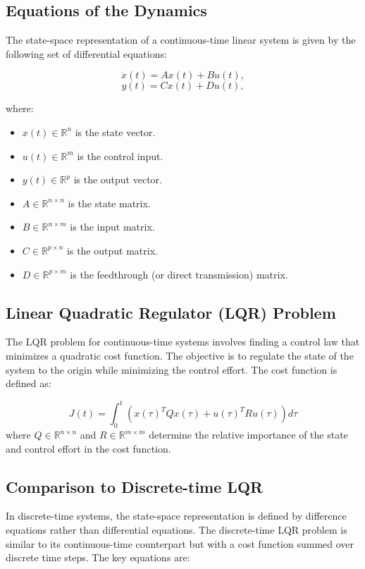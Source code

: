 \documentclass[a4 paper]{article}
\begin{document}
\subsection{Equations of the Dynamics}
The state-space representation of a continuous-time linear system is given by the following set of differential equations:

\begin{equation}
    \dot{x}(t) = A x(t) + B u(t),
\end{equation}
\begin{equation}
    y(t) = C x(t) + D u(t),
\end{equation}

where:
\begin{itemize}
    \item $x(t) \in \mathbb{R}^n$ is the state vector.
    \item $u(t) \in \mathbb{R}^m$ is the control input.
    \item $y(t) \in \mathbb{R}^p$ is the output vector.
    \item $A \in \mathbb{R}^{n \times n}$ is the state matrix.
    \item $B \in \mathbb{R}^{n \times m}$ is the input matrix.
    \item $C \in \mathbb{R}^{p \times n}$ is the output matrix.
    \item $D \in \mathbb{R}^{p \times m}$ is the feedthrough (or direct transmission) matrix.
\end{itemize}

\subsection{Linear Quadratic Regulator (LQR) Problem}
The LQR problem for continuous-time systems involves finding a control law that minimizes a quadratic cost function. 
The objective is to regulate the state of the system to the origin while minimizing the control effort. The cost function is defined as:

\begin{equation} \label{eq:continuous_cost_function}
    J(t) = \int_{0}^{t} \left( x(\tau)^T Q x(\tau) + u(\tau)^T R u(\tau) \right) d\tau
\end{equation}
where $Q \in \mathbb{R}^{n \times n}$ and $R \in \mathbb{R}^{m \times m}$ determine the relative importance of the state and 
control effort in the cost function.


\subsection{Comparison to Discrete-time LQR}
In discrete-time systems, the state-space representation is defined by difference equations rather than differential equations. 
The discrete-time LQR problem is similar to its continuous-time counterpart but with a cost function summed over discrete time steps. 
The key equations are:
\end{document}
